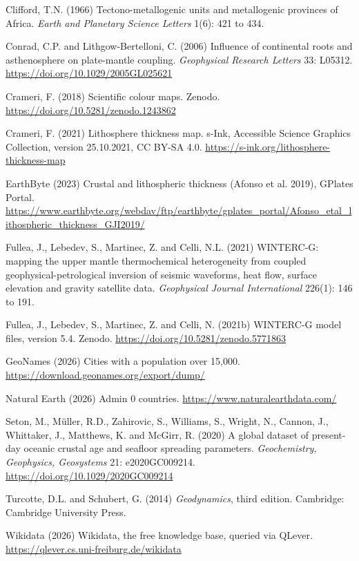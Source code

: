 \documentclass[11pt,a4paper]{article}
\begin{document}
Clifford, T.N. (1966) Tectono-metallogenic units and metallogenic provinces of Africa. \emph{Earth and Planetary Science Letters} 1(6): 421 to 434.

Conrad, C.P. and Lithgow-Bertelloni, C. (2006) Influence of continental roots and asthenosphere on plate-mantle coupling. \emph{Geophysical Research Letters} 33: L05312. \url{https://doi.org/10.1029/2005GL025621}

Crameri, F. (2018) Scientific colour maps. Zenodo. \url{https://doi.org/10.5281/zenodo.1243862}

Crameri, F. (2021) Lithosphere thickness map. s-Ink, Accessible Science Graphics Collection, version 25.10.2021, CC BY-SA 4.0. \url{https://s-ink.org/lithosphere-thickness-map}

EarthByte (2023) Crustal and lithospheric thickness (Afonso et al. 2019), GPlates Portal. \url{https://www.earthbyte.org/webdav/ftp/earthbyte/gplates_portal/Afonso_etal_lithospheric_thickness_GJI2019/}

Fullea, J., Lebedev, S., Martinec, Z. and Celli, N.L. (2021) WINTERC-G: mapping the upper mantle thermochemical heterogeneity from coupled geophysical-petrological inversion of seismic waveforms, heat flow, surface elevation and gravity satellite data. \emph{Geophysical Journal International} 226(1): 146 to 191.

Fullea, J., Lebedev, S., Martinec, Z. and Celli, N. (2021b) WINTERC-G model files, version 5.4. Zenodo. \url{https://doi.org/10.5281/zenodo.5771863}

GeoNames (2026) Cities with a population over 15,000. \url{https://download.geonames.org/export/dump/}

Natural Earth (2026) Admin 0 countries. \url{https://www.naturalearthdata.com/}

Seton, M., M\"uller, R.D., Zahirovic, S., Williams, S., Wright, N., Cannon, J., Whittaker, J., Matthews, K. and McGirr, R. (2020) A global dataset of present-day oceanic crustal age and seafloor spreading parameters. \emph{Geochemistry, Geophysics, Geosystems} 21: e2020GC009214. \url{https://doi.org/10.1029/2020GC009214}

Turcotte, D.L. and Schubert, G. (2014) \emph{Geodynamics}, third edition. Cambridge: Cambridge University Press.

Wikidata (2026) Wikidata, the free knowledge base, queried via QLever. \url{https://qlever.cs.uni-freiburg.de/wikidata}
\end{document}

